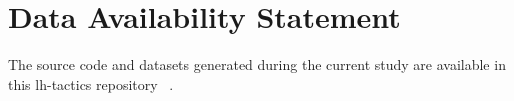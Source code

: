 \section{Data Availability Statement}

The source code and datasets generated during the current study are available in
this lh-tactics repository ~\cite{lh-tactics}.
